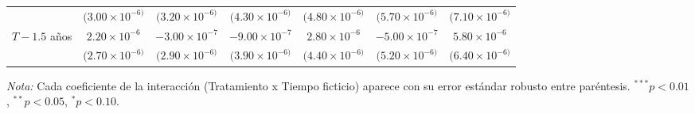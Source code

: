 \begin{table}[htbp]
\begin{adjustbox}{max width=\textwidth}
\begin{tabular}{lcccccc}
         & $(3.00\times 10^{-6)}$ & $(3.20\times 10^{-6)}$ & $(4.30\times 10^{-6)}$ & $(4.80\times 10^{-6)}$ & $(5.70\times 10^{-6)}$ & $(7.10\times 10^{-6)}$ \\
        $T - 1.5$ años & $2.20\times 10^{-6}$ & $-3.00\times 10^{-7}$ & $-9.00\times 10^{-7}$ & $2.80\times 10^{-6}$ & $-5.00\times 10^{-7}$ & $5.80\times 10^{-6}$ \\
         & $(2.70\times 10^{-6)}$ & $(2.90\times 10^{-6)}$ & $(3.90\times 10^{-6)}$ & $(4.40\times 10^{-6)}$ & $(5.20\times 10^{-6)}$ & $(6.40\times 10^{-6)}$ \\
        \bottomrule
    \end{tabular}
    \end{adjustbox}

    \vspace{0.4em}
    \begin{minipage}{0.93\textwidth}
        \tiny \textit{Nota:} Cada coeficiente de la interacción (Tratamiento x Tiempo ficticio) aparece con su error estándar robusto entre paréntesis. ${}^{***} p<0.01$, ${}^{**} p<0.05$, ${}^{*} p<0.10$.
    \end{minipage}
\end{table}

\clearpage

